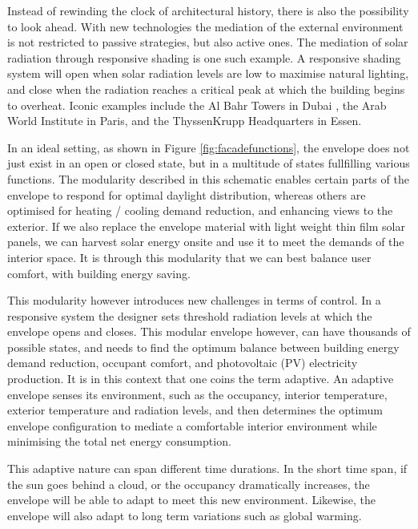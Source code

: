 Instead of rewinding the clock of architectural history, there is also the possibility to look ahead. With new technologies the mediation of the external environment is not restricted to passive strategies, but also active ones. The mediation of solar radiation through responsive shading is one such example. A responsive shading system will open when solar radiation levels are low to maximise natural lighting, and close when the radiation reaches a critical peak at which the building begins to overheat. Iconic examples include the Al Bahr Towers in Dubai \cite{oborn2012bahr}, the Arab World Institute in Paris, and the ThyssenKrupp Headquarters in Essen. 


In an ideal setting, as shown in Figure \ref{fig:facadefunctions}, the envelope does not just exist in an open or closed state, but in a multitude of states fullfilling various functions. The modularity described in this schematic enables certain parts of the envelope to respond for optimal daylight distribution, whereas others are optimised for heating / cooling demand reduction, and enhancing views to the exterior. If we also replace the envelope material with light weight thin film solar panels, we can harvest solar energy onsite and use it to meet the demands of the interior space. It is through this modularity that we can best balance user comfort, with building energy saving.

This modularity however introduces new challenges in terms of control. In a responsive system the designer sets threshold radiation levels at which the envelope opens and closes. This modular envelope however, can have thousands of possible states, and needs to find the optimum balance between building energy demand reduction, occupant comfort, and photovoltaic (PV) electricity production. It is in this context that one coins the term adaptive. An adaptive envelope senses its environment, such as the occupancy, interior temperature, exterior temperature and radiation levels, and then determines the optimum envelope configuration to mediate a comfortable interior environment while minimising the total net energy consumption. 

This adaptive nature can span different time durations. In the short time span, if the sun goes behind a cloud, or the occupancy dramatically increases, the envelope will be able to adapt to meet this new environment. Likewise, the envelope will also adapt to long term variations such as global warming. 

